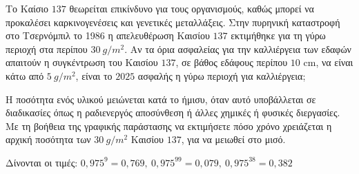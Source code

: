 \begin{alist}[resume]
\item 
\begin{rlist}
\item Το Καίσιο $137$ θεωρείται επικίνδυνο για τους οργανισμούς, καθώς μπορεί να προκαλέσει καρκινογενέσεις και γενετικές μεταλλάξεις. Στην πυρηνική καταστροφή στο Τσερνόμπιλ το 1986 η απελευθέρωση Καισίου $137$ εκτιμήθηκε για τη γύρω περιοχή στα περίπου $30\ g/m^{2}$. Αν τα όρια ασφαλείας για την καλλιέργεια των εδαφών απαιτούν η συγκέντρωση του Καισίου $137$, σε βάθος εδάφους περίπου $10$ cm, να είναι κάτω από $5\ g/m^{2}$, είναι το $2025$ ασφαλής η γύρω περιοχή για καλλιέργεια;
\item Η ποσότητα ενός υλικού μειώνεται κατά το ήμισυ, όταν αυτό υποβάλλεται σε διαδικασίες όπως η ραδιενεργός αποσύνθεση ή άλλες χημικές ή φυσικές διεργασίες. Με τη βοήθεια της γραφικής παράστασης να εκτιμήσετε πόσο χρόνο χρειάζεται η αρχική ποσότητα των $30\ g/m^{2}$ Καισίου $137$, για να μειωθεί στο μισό.
\end{rlist}

Δίνονται οι τιμές:
$0{,}975^{9} = 0{,}769,\ 0{,}975^{99} = 0{,}079,\ 0{,}975^{38} = 0{,}382$

\end{alist}

